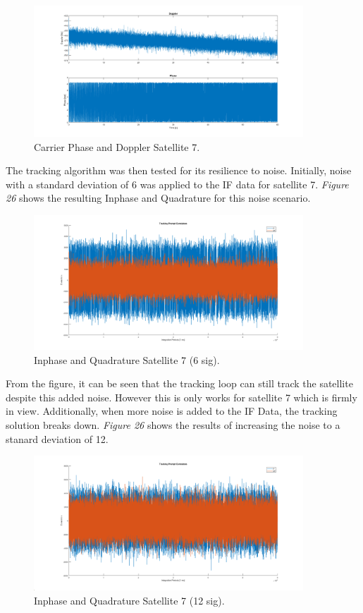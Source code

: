 \documentclass[11pt]{article}
\begin{document}
    \begin{figure}[H]
        \centering
        \includegraphics[width=0.9\textwidth]{Lab_4_Tracking_SV7.png}
        \caption{Carrier Phase and Doppler Satellite 7.}
    \end{figure}
The tracking algorithm was then tested for its resilience to noise. Initially, noise with a standard deviation of 6 was applied to the IF data for satellite 7. \emph{Figure 26} shows the resulting Inphase and Quadrature for this noise scenario.
    \begin{figure}[H]
        \centering
        \includegraphics[width=0.9\textwidth]{Lab_4_Tracking_6sig_SV7.png}
        \caption{Inphase and Quadrature Satellite 7 (6 sig).}
    \end{figure}
From the figure, it can be seen that the tracking loop can still track the satellite despite this added noise. However this is only works for satellite 7 which is firmly in view. Additionally, when more noise is added to the IF Data, the tracking solution breaks down. \emph{Figure 26} shows the results of increasing the noise to a stanard deviation of 12. 
     \begin{figure}[H]
        \centering
        \includegraphics[width=0.9\textwidth]{Lab_4_Tracking_12sig_SV7.png}
        \caption{Inphase and Quadrature Satellite 7 (12 sig).}
    \end{figure}
\end{document}

